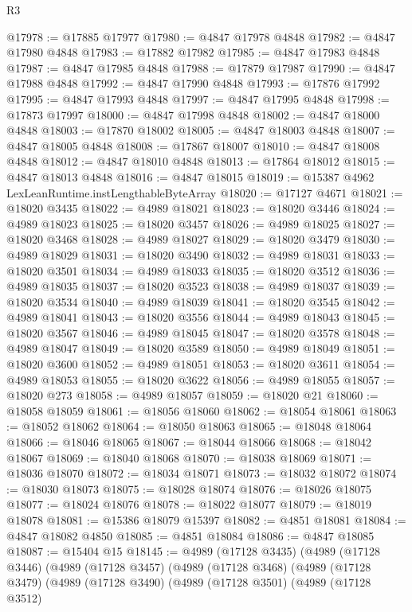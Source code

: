 \begin{lexlean}{R3}
\begin{coremodule}
@17978 := @17885 @17977
@17980 := @4847 @17978 @4848
@17982 := @4847 @17980 @4848
@17983 := @17882 @17982
@17985 := @4847 @17983 @4848
@17987 := @4847 @17985 @4848
@17988 := @17879 @17987
@17990 := @4847 @17988 @4848
@17992 := @4847 @17990 @4848
@17993 := @17876 @17992
@17995 := @4847 @17993 @4848
@17997 := @4847 @17995 @4848
@17998 := @17873 @17997
@18000 := @4847 @17998 @4848
@18002 := @4847 @18000 @4848
@18003 := @17870 @18002
@18005 := @4847 @18003 @4848
@18007 := @4847 @18005 @4848
@18008 := @17867 @18007
@18010 := @4847 @18008 @4848
@18012 := @4847 @18010 @4848
@18013 := @17864 @18012
@18015 := @4847 @18013 @4848
@18016 := @4847 @18015
@18019 := @15387 @4962 LexLeanRuntime.instLengthableByteArray
@18020 := @17127 @4671
@18021 := @18020 @3435
@18022 := @4989 @18021
@18023 := @18020 @3446
@18024 := @4989 @18023
@18025 := @18020 @3457
@18026 := @4989 @18025
@18027 := @18020 @3468
@18028 := @4989 @18027
@18029 := @18020 @3479
@18030 := @4989 @18029
@18031 := @18020 @3490
@18032 := @4989 @18031
@18033 := @18020 @3501
@18034 := @4989 @18033
@18035 := @18020 @3512
@18036 := @4989 @18035
@18037 := @18020 @3523
@18038 := @4989 @18037
@18039 := @18020 @3534
@18040 := @4989 @18039
@18041 := @18020 @3545
@18042 := @4989 @18041
@18043 := @18020 @3556
@18044 := @4989 @18043
@18045 := @18020 @3567
@18046 := @4989 @18045
@18047 := @18020 @3578
@18048 := @4989 @18047
@18049 := @18020 @3589
@18050 := @4989 @18049
@18051 := @18020 @3600
@18052 := @4989 @18051
@18053 := @18020 @3611
@18054 := @4989 @18053
@18055 := @18020 @3622
@18056 := @4989 @18055
@18057 := @18020 @273
@18058 := @4989 @18057
@18059 := @18020 @21
@18060 := @18058 @18059
@18061 := @18056 @18060
@18062 := @18054 @18061
@18063 := @18052 @18062
@18064 := @18050 @18063
@18065 := @18048 @18064
@18066 := @18046 @18065
@18067 := @18044 @18066
@18068 := @18042 @18067
@18069 := @18040 @18068
@18070 := @18038 @18069
@18071 := @18036 @18070
@18072 := @18034 @18071
@18073 := @18032 @18072
@18074 := @18030 @18073
@18075 := @18028 @18074
@18076 := @18026 @18075
@18077 := @18024 @18076
@18078 := @18022 @18077
@18079 := @18019 @18078
@18081 := @15386 @18079 @15397
@18082 := @4851 @18081
@18084 := @4847 @18082 @4850
@18085 := @4851 @18084
@18086 := @4847 @18085
@18087 := @15404 @15
@18145 := @4989
    (@17128 @3435)
    (@4989
      (@17128 @3446)
      (@4989
        (@17128 @3457)
        (@4989
          (@17128 @3468)
          (@4989
            (@17128 @3479)
            (@4989
              (@17128 @3490)
              (@4989
                (@17128 @3501)
                (@4989
                  (@17128 @3512)

\end{coremodule}
\end{lexlean}
